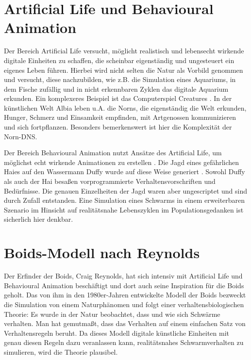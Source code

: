 \documentclass[draft=false
              ,paper=a4
              ,twoside=false
              ,fontsize=11pt
              ,headsepline
              ,BCOR10mm
              ,DIV11
              ,bibtotoc
              ,liststotoc
              ]{scrbook}
\begin{document}
\section{Artificial Life und Behavioural Animation}
Der Bereich Artificial Life versucht, möglicht realistisch und lebensecht wirkende digitale Einheiten zu schaffen, die scheinbar eigenständig und ungesteuert ein eigenes Leben führen. Hierbei wird nicht selten die Natur als Vorbild genommen und versucht, diese nachzubilden, wie z.B. die Simulation eines Aquariums, in dem Fische zufällig und in nicht erkennbaren Zyklen das digitale Aquarium erkunden. Ein komplexeres Beispiel ist das Computerspiel Creatures \cite{norns}. In der künstlichen Welt Albia leben u.A. die Norns, die eigenständig die Welt erkunden, Hunger, Schmerz und Einsamkeit empfinden, mit Artgenossen kommunizieren und sich fortpflanzen. Besonders bemerkenswert ist hier die Komplexität der Norn-DNS.

Der Bereich Behavioural Animation nutzt Ansätze des Artificial Life, um möglichst echt wirkende Animationen zu erstellen \cite{reynolds87}. Die Jagd eines gefährlichen Haies auf den Wassermann Duffy wurde auf diese Weise generiert \cite{Funge:1999:CMK:311535.311538}. Sowohl Duffy als auch der Hai besaßen vorprogrammierte Verhaltensvorschriften und Bedürfnisse. Die genauen Einzelheiten der Jagd waren aber ungescriptet und sind durch Zufall entstanden.
Eine Simulation eines Schwarms in einem erweiterbaren Szenario im Hinsicht auf realitätsnahe Lebenszyklen im Populationsgedanken ist sicherlich hier denkbar.
\section{Boids-Modell nach Reynolds}
Der Erfinder der Boids, Craig Reynolds, hat sich intensiv mit Artificial Life und Behavioural Animation beschäftigt und dort auch seine Inspiration für die Boids geholt.
Das von ihm in den 1980er-Jahren entwickelte Modell der Boids \cite{reynolds87}\cite{oai:CiteSeerPSU:509294}\cite{Reynolds:1988:NBI} bezweckt die Simulation von einem Naturphänomen und folgt einer verhaltensbiologischen Theorie: Es wurde in der Natur beobachtet, dass und wie sich Schwärme verhalten. Man hat gemutmaßt, dass das Verhalten auf einem einfachen Satz von Verhaltensregeln beruht. Da dieses Modell digitale künstliche Einheiten mit genau diesen Regeln dazu veranlassen kann, realitätsnahes Schwarmverhalten zu simulieren, wird die Theorie plausibel. 
\end{document}
